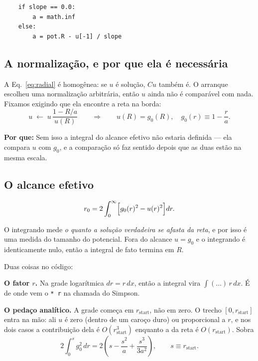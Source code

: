\documentclass[11pt,a4paper]{article}
\newcommand{\pq}[1]{\medskip\noindent\textbf{Por que:} #1\medskip}
\begin{document}
\begin{lstlisting}
    if slope == 0.0:
        a = math.inf
    else:
        a = pot.R - u[-1] / slope
\end{lstlisting}

\subsection{A normalização, e por que ela é necessária}

A Eq.~\eqref{eq:radial} é homogênea: se $u$ é solução, $Cu$ também é. O arranque
escolheu uma normalização arbitrária, então $u$ ainda não é comparável com nada.
Fixamos exigindo que ela encontre a reta na borda:
\begin{equation}
  u \;\longleftarrow\; u\,\frac{1 - R/a}{u(R)}
  \qquad\Longrightarrow\qquad u(R) = g_0(R), \quad g_0(r) \equiv 1 - \frac{r}{a}.
\end{equation}

\pq{Sem isso a integral do alcance efetivo não estaria definida --- ela compara
$u$ com $g_0$, e a comparação só faz sentido depois que as duas estão na mesma
escala.}

\subsection{O alcance efetivo}

\begin{equation}
  r_0 = 2\int_0^\infty \Bigl[g_0(r)^2 - u(r)^2\Bigr]dr .
  \label{eq:r0}
\end{equation}

O integrando mede \emph{o quanto a solução verdadeira se afasta da reta}, e por
isso é uma medida do tamanho do potencial. Fora do alcance $u = g_0$ e o
integrando é identicamente nulo, então a integral de fato termina em $R$.

Duas coisas no código:

\textbf{O fator $r$.} Na grade logarítmica $dr = r\,dx$, então a integral vira
$\int(\dots)\,r\,dx$. É de onde vem o \texttt{* r} na chamada do Simpson.

\textbf{O pedaço analítico.} A grade começa em $r_{\text{start}}$, não em zero.
O trecho $[0, r_{\text{start}}]$ entra na mão: ali $u$ é zero (dentro de um
caroço duro) ou proporcional a $r$, e nos dois casos a contribuição dela é
$O(r_{\text{start}}^3)$ enquanto a da reta é $O(r_{\text{start}})$. Sobra
\begin{equation}
  2\int_0^{s}g_0^2\,dr = 2\left(s - \frac{s^2}{a} + \frac{s^3}{3a^2}\right),
  \qquad s \equiv r_{\text{start}}.
\end{equation}
\end{document}
